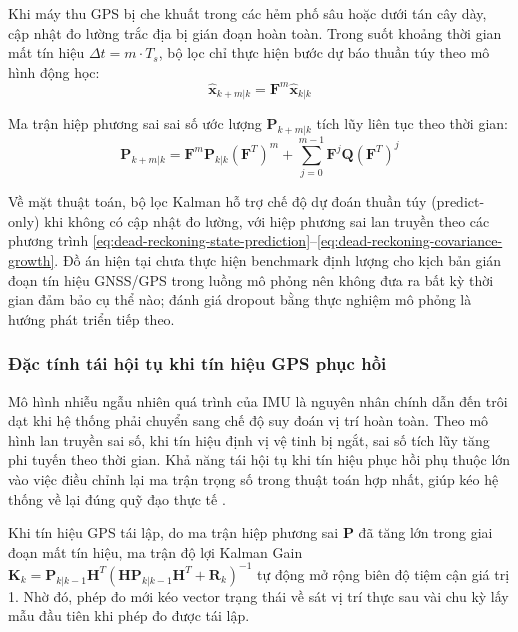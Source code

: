 \hspace{0.5cm} Khi máy thu GPS bị che khuất trong các hẻm phố sâu hoặc dưới tán cây dày, cập nhật đo lường trắc địa bị gián đoạn hoàn toàn. Trong suốt khoảng thời gian mất tín hiệu $\Delta t = m \cdot T_s$, bộ lọc chỉ thực hiện bước dự báo thuần túy theo mô hình động học:
\begin{equation}
\hat{\mathbf{x}}_{k+m|k} = \mathbf{F}^m \hat{\mathbf{x}}_{k|k}
\label{eq:dead-reckoning-state-prediction}
\end{equation}

Ma trận hiệp phương sai sai số ước lượng $\mathbf{P}_{k+m|k}$ tích lũy liên tục theo thời gian:
\begin{equation}
\mathbf{P}_{k+m|k} = \mathbf{F}^m \mathbf{P}_{k|k} (\mathbf{F}^T)^m + \sum_{j=0}^{m-1} \mathbf{F}^j \mathbf{Q} (\mathbf{F}^T)^j
\label{eq:dead-reckoning-covariance-growth}
\end{equation}

Về mặt thuật toán, bộ lọc Kalman hỗ trợ chế độ dự đoán thuần túy (predict-only) khi không có cập nhật đo lường, với hiệp phương sai lan truyền theo các phương trình \ref{eq:dead-reckoning-state-prediction}--\ref{eq:dead-reckoning-covariance-growth}. Đồ án hiện tại chưa thực hiện benchmark định lượng cho kịch bản gián đoạn tín hiệu GNSS/GPS trong luồng mô phỏng nên không đưa ra bất kỳ thời gian đảm bảo cụ thể nào; đánh giá dropout bằng thực nghiệm mô phỏng là hướng phát triển tiếp theo.

\subsubsection{Đặc tính tái hội tụ khi tín hiệu GPS phục hồi}

\hspace{0.5cm} Mô hình nhiễu ngẫu nhiên quá trình của IMU là nguyên nhân chính dẫn đến trôi dạt khi hệ thống phải chuyển sang chế độ suy đoán vị trí hoàn toàn. Theo mô hình lan truyền sai số, khi tín hiệu định vị vệ tinh bị ngắt, sai số tích lũy tăng phi tuyến theo thời gian. Khả năng tái hội tụ khi tín hiệu phục hồi phụ thuộc lớn vào việc điều chỉnh lại ma trận trọng số trong thuật toán hợp nhất, giúp kéo hệ thống về lại đúng quỹ đạo thực tế \cite{groves2013principles}.

Khi tín hiệu GPS tái lập, do ma trận hiệp phương sai $\mathbf{P}$ đã tăng lớn trong giai đoạn mất tín hiệu, ma trận độ lợi Kalman Gain $\mathbf{K}_k = \mathbf{P}_{k|k-1} \mathbf{H}^T (\mathbf{H} \mathbf{P}_{k|k-1} \mathbf{H}^T + \mathbf{R}_k)^{-1}$ tự động mở rộng biên độ tiệm cận giá trị 1. Nhờ đó, phép đo mới kéo vector trạng thái về sát vị trí thực sau vài chu kỳ lấy mẫu đầu tiên khi phép đo được tái lập.

